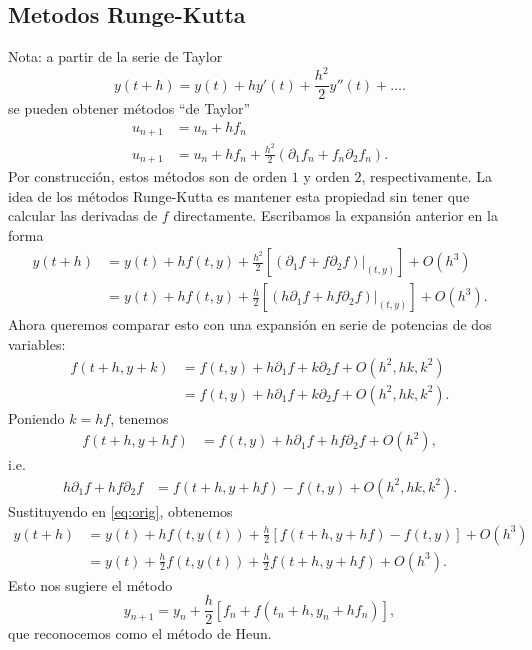 \documentclass[11pt,letterpaper]{report}
\begin{document}
\subsection{Metodos Runge-Kutta}
Nota: a partir de la serie de Taylor
\begin{equation}
  y(t+h) = y(t) + hy'(t) + \frac{h^{2}}{2}y''(t) + \dots
.\end{equation}
se pueden obtener métodos ``de Taylor''
\begin{align}
  u_{n+1} &= u_n + hf_n \\
  u_{n+1} &= u_n
  + hf_n
  + \frac{h^{2}}{2}(\partial_1f_n + f_n \partial_2 f_n)
.\end{align}
Por construcción, estos métodos son de orden $1$ y orden $2$,
respectivamente. La idea de los métodos Runge-Kutta es mantener esta
propiedad sin tener que calcular las derivadas de $f$ directamente.
Escribamos la expansión anterior en la forma
\begin{align}\label{eq:orig}
  y(t+h)
  &= y(t)
    + h f(t,y)
    + \frac{h^{2}}{2}
    \left[ (\partial_1 f + f \partial_2 f)|_{(t,y)} \right]
    + O(h^{3}) \\
  &= y(t)
    + h f(t,y)
    + \frac{h}{2}
    \left[ (h\partial_1 f + h f \partial_2 f)|_{(t,y)} \right]
    + O(h^{3})
.\end{align}
Ahora queremos comparar esto con una expansión en serie de potencias
de dos variables:
\begin{align}
  f(t+h,y+k)
  &=
  f(t,y) + h \partial _1 f + k \partial _2 f + O(h^{2},hk,k^{2})
  \\
  &=
  f(t,y) + h \partial _1 f + k \partial _2 f + O(h^{2},hk,k^{2}).
\end{align}
Poniendo $k=hf$, tenemos
\begin{align}
  f(t+h,y+hf)
  &=
  f(t,y) + h \partial _1 f + hf \partial _2 f
  + O(h^{2}),
\end{align}
i.e.
\begin{align}
  h \partial _1 f + hf \partial _2 f
  &=
  f(t+h,y+hf) - f(t,y)
  + O(h^{2},hk,k^{2}).
\end{align}
Sustituyendo en \eqref{eq:orig}, obtenemos
\begin{align}\label{eq:sust}
  y(t+h)
  &= y(t)
    + hf(t,y(t))
    + \frac{h}{2}
    \left[
    f(t+h,y+hf) - f(t,y)
    \right]
    + O(h^{3})
  \\
  &= y(t)
    + \frac{h}{2} f(t,y(t))
    + \frac{h}{2} f(t+h,y+hf)
    + O(h^{3})
.\end{align}
Esto nos sugiere el método
\begin{equation}
  y_{n+1} = y_n + \frac{h}{2} \left[
    f_n + f(t_n + h, y_n + hf_n)
  \right]
,\end{equation}
que reconocemos como el método de Heun.
\end{document}
